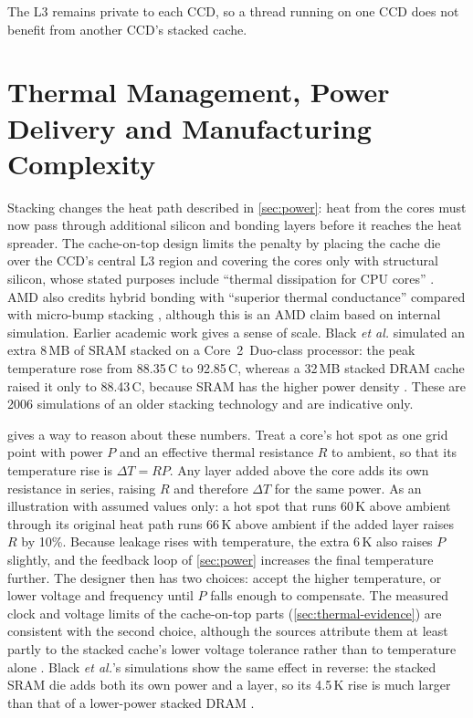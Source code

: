 

The L3 remains private to each CCD, so a thread running on one CCD does not benefit from another CCD's stacked cache.

\section{Thermal Management, Power Delivery and Manufacturing Complexity}
\label{sec:thermal}

Stacking changes the heat path described in \cref{sec:power}: heat from the cores must now pass through additional silicon and bonding layers before it reaches the heat spreader. The cache-on-top design limits the penalty by placing the cache die over the CCD's central L3 region \cite{amd2022epyc7003} and covering the cores only with structural silicon, whose stated purposes include ``thermal dissipation for CPU cores'' \cite[slide~12]{wuu2022vcache}. AMD also credits hybrid bonding with ``superior thermal conductance'' compared with micro-bump stacking \cite[slide~15]{wuu2022vcache}, although this is an AMD claim based on internal simulation. Earlier academic work gives a sense of scale. Black \emph{et al.} simulated an extra 8\,MB of SRAM stacked on a Core~2~Duo-class processor: the peak temperature rose from 88.35\,\textdegree C to 92.85\,\textdegree C, whereas a 32\,MB stacked DRAM cache raised it only to 88.43\,\textdegree C, because SRAM has the higher power density \cite{blackStacking3DMicroarchitecture2006}. These are 2006 simulations of an older stacking technology and are indicative only.

 gives a way to reason about these numbers. Treat a core's hot spot as one grid point with power $P$ and an effective thermal resistance $R$ to ambient, so that its temperature rise is $\Delta T = RP$. Any layer added above the core adds its own resistance in series, raising $R$ and therefore $\Delta T$ for the same power. As an illustration with assumed values only: a hot spot that runs 60\,K above ambient through its original heat path runs 66\,K above ambient if the added layer raises $R$ by 10\%. Because leakage rises with temperature, the extra 6\,K also raises $P$ slightly, and the feedback loop of \cref{sec:power} increases the final temperature further. The designer then has two choices: accept the higher temperature, or lower voltage and frequency until $P$ falls enough to compensate. The measured clock and voltage limits of the cache-on-top parts (\cref{sec:thermal-evidence}) are consistent with the second choice, although the sources attribute them at least partly to the stacked cache's lower voltage tolerance rather than to temperature alone \cite{lamAMDs7950X3DZen2023}. Black \emph{et al.}'s simulations show the same effect in reverse: the stacked SRAM die adds both its own power and a layer, so its 4.5\,K rise is much larger than that of a lower-power stacked DRAM \cite{blackStacking3DMicroarchitecture2006}.

